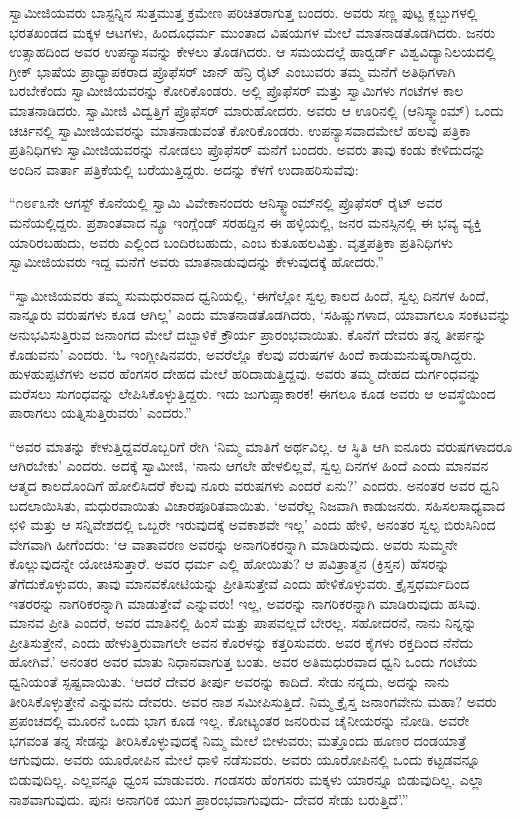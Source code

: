  ಸ್ವಾಮೀಜಿಯವರು ಬಾಸ್ಟನ್ನಿನ ಸುತ್ತಮುತ್ತ ಕ್ರಮೇಣ ಪರಿಚಿತರಾಗುತ್ತ ಬಂದರು. ಅವರು ಸಣ್ಣ ಪುಟ್ಟ ಕ್ಲಬ್ಬುಗಳಲ್ಲಿ ಭರತಖಂಡದ ಮಕ್ಕಳ ಆಟಗಳು, ಹಿಂದೂಧರ್ಮ ಮುಂತಾದ ವಿಷಯಗಳ ಮೇಲೆ ಮಾತನಾಡತೊಡಗಿದರು. ಜನರು ಉತ್ಸಾಹದಿಂದ ಅವರ ಉಪನ್ಯಾಸವನ್ನು ಕೇಳಲು ತೊಡಗಿದರು. ಆ ಸಮಯದಲ್ಲೆ ಹಾರ್‍ವರ್ಡ್ ವಿಶ್ವವಿದ್ಯಾನಿಲಯದಲ್ಲಿ ಗ್ರೀಕ್ ಭಾಷೆಯ ಪ್ರಾಧ್ಯಾಪಕರಾದ ಪ್ರೊಫೆಸರ್ ಜಾನ್ ಹೆನ್ರಿ ರೈಟ್ ಎಂಬುವರು ತಮ್ಮ ಮನೆಗೆ ಅತಿಥಿಗಳಾಗಿ ಬರಬೇಕೆಂದು ಸ್ವಾಮೀಜಿಯವರನ್ನು ಕೋರಿಕೊಂಡರು. ಅಲ್ಲಿ ಪ್ರೊಫೆಸರ್ ಮತ್ತು ಸ್ವಾಮಿಗಳು ಗಂಟೆಗಳ ಕಾಲ ಮಾತನಾಡಿದರು. ಸ್ವಾಮೀಜಿ ವಿದ್ವತ್ತಿಗೆ ಪ್ರೊಫೆಸರ್ ಮಾರುಹೋದರು. ಅವರು ಆ ಊರಿನಲ್ಲಿ (ಆನಿಸ್ಕ್ವಾಂಮ್) ಒಂದು ಚರ್ಚಿನಲ್ಲಿ ಸ್ವಾಮೀಜಿಯವರನ್ನು ಮಾತನಾಡುವಂತೆ ಕೋರಿಕೊಂಡರು. ಉಪನ್ಯಾಸವಾದಮೇಲೆ ಹಲವು ಪತ್ರಿಕಾ ಪ್ರತಿನಿಧಿಗಳು ಸ್ವಾಮೀಜಿಯವರನ್ನು ನೋಡಲು ಪ್ರೊಫೆಸರ್ ಮನೆಗೆ ಬಂದರು. ಅವರು ತಾವು ಕಂಡು ಕೇಳಿದುದನ್ನು ಅಂದಿನ ವಾರ್ತಾ ಪತ್ರಿಕೆಯಲ್ಲಿ ಬರೆಯುತ್ತಿದ್ದರು. ಅದನ್ನು ಕೆಳಗೆ ಉದಾಹರಿಸುವೆವು: 

 “೧೮೯೩ನೇ ಆಗಸ್ಟ್ ಕೊನೆಯಲ್ಲಿ ಸ್ವಾಮಿ ವಿವೇಕಾನಂದರು ಆನಿಸ್ಕ್ವಾಂಮ್‍ನಲ್ಲಿ ಪ್ರೊಫೆಸರ್ ರೈಟ್ ಅವರ ಮನೆಯಲ್ಲಿದ್ದರು. ಪ್ರಶಾಂತವಾದ ನ್ಯೂ ಇಂಗ್ಲೆಂಡ್ ಸರಹದ್ದಿನ ಈ ಹಳ್ಳಿಯಲ್ಲಿ, ಜನರ ಮನಸ್ಸಿನಲ್ಲಿ ಈ ಭವ್ಯ ವ್ಯಕ್ತಿ ಯಾರಿರಬಹುದು, ಅವರು ಎಲ್ಲಿಂದ ಬಂದಿರಬಹುದು, ಎಂಬ ಕುತೂಹಲವಿತ್ತು. ವೃತ್ತಪತ್ರಿಕಾ ಪ್ರತಿನಿಧಿಗಳು ಸ್ವಾಮೀಜಿಯವರು ಇದ್ದ ಮನೆಗೆ ಅವರು ಮಾತನಾಡುವುದನ್ನು ಕೇಳುವುದಕ್ಕೆ ಹೋದರು.” 

 “ಸ್ವಾಮೀಜಿಯವರು ತಮ್ಮ ಸುಮಧುರವಾದ ಧ್ವನಿಯಲ್ಲಿ, ‘ಈಗೆಲ್ಲೋ ಸ್ವಲ್ಪ ಕಾಲದ ಹಿಂದೆ, ಸ್ವಲ್ಪ ದಿನಗಳ ಹಿಂದೆ, ನಾನ್ನೂರು ವರುಷಗಳು ಕೂಡ ಆಗಿಲ್ಲ’ ಎಂದು ಮಾತನಾಡತೊಡಗಿದರು, ‘ಸಹಿಷ್ಣುಗಳಾದ, ಯಾವಾಗಲೂ ಸಂಕಟವನ್ನು ಅನುಭವಿಸುತ್ತಿರುವ ಜನಾಂಗದ ಮೇಲೆ ದಬ್ಬಾಳಿಕೆ ಕ್ರೌರ್ಯ ಪ್ರಾರಂಭವಾಯಿತು. ಕೊನೆಗೆ ದೇವರು ತನ್ನ ತೀರ್ಪನ್ನು ಕೊಡುವನು’ ಎಂದರು. ‘ಓ ಇಂಗ್ಲೀಷಿನವರು, ಅವರೆಲ್ಲೊ ಕೆಲವು ವರುಷಗಳ ಹಿಂದೆ ಕಾಡುಮನುಷ್ಯರಾಗಿದ್ದರು. ಹುಳಹುಪ್ಪಟೆಗಳು ಅವರ ಹೆಂಗಸರ ದೇಹದ ಮೇಲೆ ಹರಿದಾಡುತ್ತಿದ್ದವು. ಅವರು ತಮ್ಮ ದೇಹದ ದುರ್ಗಂಧವನ್ನು ಮರೆಸಲು ಸುಗಂಧವನ್ನು ಲೇಪಿಸಿಕೊಳ್ಳುತ್ತಿದ್ದರು. ಇದು ಜುಗುಪ್ಸಾಕಾರಕ! ಈಗಲೂ ಕೂಡ ಅವರು ಆ ಅವಸ್ಥೆಯಿಂದ ಪಾರಾಗಲು ಯತ್ನಿಸುತ್ತಿರುವರು’ ಎಂದರು.” 

 “ಅವರ ಮಾತನ್ನು ಕೇಳುತ್ತಿದ್ದವರೊಬ್ಬರಿಗೆ ರೇಗಿ ‘ನಿಮ್ಮ ಮಾತಿಗೆ ಅರ್ಥವಿಲ್ಲ. ಆ ಸ್ಥಿತಿ ಆಗಿ ಐನೂರು ವರುಷಗಳಾದರೂ ಆಗಿರಬೇಕು’ ಎಂದರು. ಅದಕ್ಕೆ ಸ್ವಾಮೀಜಿ, ‘ನಾನು ಆಗಲೇ ಹೇಳಲಿಲ್ಲವೆ, ಸ್ವಲ್ಪ ದಿನಗಳ ಹಿಂದೆ ಎಂದು ಮಾನವನ ಆತ್ಮದ ಕಾಲದೊಂದಿಗೆ ಹೋಲಿಸಿದರೆ ಕೆಲವು ನೂರು ವರುಷಗಳು ಎಂದರೆ ಏನು?’ ಎಂದರು. ಅನಂತರ ಅವರ ಧ್ವನಿ ಬದಲಾಯಿಸಿತು, ಮಧುರವಾಯಿತು ವಿಚಾರಪೂರಿತವಾಯಿತು. ‘ಅವರೆಲ್ಲ ನಿಜವಾಗಿ ಕಾಡುಜನರು. ಸಹಿಸಲಸಾಧ್ಯವಾದ ಛಳಿ ಮತ್ತು ಆ ಸನ್ನಿವೇಶದಲ್ಲಿ ಒಬ್ಬರೇ ಇರುವುದಕ್ಕೆ ಅವಕಾಶವೇ ಇಲ್ಲ’ ಎಂದು ಹೇಳಿ, ಅನಂತರ ಸ್ವಲ್ಪ ಬಿರುಸಿನಿಂದ ವೇಗವಾಗಿ ಹೀಗೆಂದರು: ‘ಆ ವಾತಾವರಣ ಅವರನ್ನು ಅನಾಗರಿಕರನ್ನಾಗಿ ಮಾಡಿರುವುದು. ಅವರು ಸುಮ್ಮನೇ ಕೊಲ್ಲುವುದನ್ನೇ ಯೋಚಿಸುತ್ತಾರೆ. ಅವರ ಧರ್ಮ ಎಲ್ಲಿ ಹೋಯಿತು? ಆ ಪವಿತ್ರಾತ್ಮನ (ಕ್ರಿಸ್ತನ) ಹೆಸರನ್ನು ತೆಗೆದುಕೊಳ್ಳುವರು, ತಾವು ಮಾನವಕೋಟಿಯನ್ನು ಪ್ರೀತಿಸುತ್ತೇವೆ ಎಂದು ಹೇಳಿಕೊಳ್ಳುವರು. ಕ್ರೈಸ್ತಧರ್ಮದಿಂದ ಇತರರನ್ನು ನಾಗರಿಕರನ್ನಾಗಿ ಮಾಡುತ್ತೇವೆ ಎನ್ನುವರು! ಇಲ್ಲ, ಅವರನ್ನು ನಾಗರಿಕರನ್ನಾಗಿ ಮಾಡಿರುವುದು ಹಸಿವು. ಮಾನವ ಪ್ರೀತಿ ಎಂದರೆ, ಅವರ ಮಾತಿನಲ್ಲಿ ಹಿಂಸೆ ಮತ್ತು ಪಾಪವಲ್ಲದೆ ಬೇರಲ್ಲ. ಸಹೋದರನೆ, ನಾನು ನಿನ್ನನ್ನು ಪ್ರೀತಿಸುತ್ತೇನೆ, ಎಂದು ಹೇಳುತ್ತಿರುವಾಗಲೇ ಅವನ ಕೊರಳನ್ನು ಕತ್ತರಿಸುವರು. ಅವರ ಕೈಗಳು ರಕ್ತದಿಂದ ನೆನೆದು ಹೋಗಿವೆ.’ ಅನಂತರ ಅವರ ಮಾತು ನಿಧಾನವಾಗುತ್ತ ಬಂತು. ಅವರ ಅತಿಮಧುರವಾದ ಧ್ವನಿ ಒಂದು ಗಂಟೆಯ ಧ್ವನಿಯಂತೆ ಸ್ಪಷ್ಟವಾಯಿತು. ‘ಆದರೆ ದೇವರ ತೀರ್ಪು ಅವರನ್ನು ಕಾದಿದೆ. ಸೇಡು ನನ್ನದು, ಅದನ್ನು ನಾನು ತೀರಿಸಿಕೊಳ್ಳುತ್ತೇನೆ ಎನ್ನುವನು ದೇವರು. ಅವರ ನಾಶ ಸಮೀಪಿಸುತ್ತಿದೆ. ನಿಮ್ಮ ಕ್ರೈಸ್ತ ಜನಾಂಗವೇನು ಮಹಾ? ಅವರು ಪ್ರಪಂಚದಲ್ಲಿ ಮೂರನೆ ಒಂದು ಭಾಗ ಕೂಡ ಇಲ್ಲ. ಕೋಟ್ಯಂತರ ಜನರಿರುವ ಚೈನೀಯರನ್ನು ನೋಡಿ. ಅವರೇ ಭಗವಂತ ತನ್ನ ಸೇಡನ್ನು ತೀರಿಸಿಕೊಳ್ಳುವುದಕ್ಕೆ ನಿಮ್ಮ ಮೇಲೆ ಬೀಳುವರು; ಮತ್ತೊಂದು ಹೂಣರ ದಂಡಯಾತ್ರೆ ಆಗುವುದು. ಅವರು ಯೂರೋಪಿನ ಮೇಲೆ ಧಾಳಿ ನಡೆಸುವರು. ಅವರು ಯೂರೋಪಿನಲ್ಲಿ ಒಂದು ಕಟ್ಟಡವನ್ನೂ ಬಿಡುವುದಿಲ್ಲ. ಎಲ್ಲವನ್ನೂ ಧ್ವಂಸ ಮಾಡುವರು. ಗಂಡಸರು ಹೆಂಗಸರು ಮಕ್ಕಳು ಯಾರನ್ನೂ ಬಿಡುವುದಿಲ್ಲ. ಎಲ್ಲಾ ನಾಶವಾಗುವುದು. ಪುನಃ ಅನಾಗರಿಕ ಯುಗ ಪ್ರಾರಂಭವಾಗುವುದು- ದೇವರ ಸೇಡು ಬರುತ್ತಿದೆ’.” 

